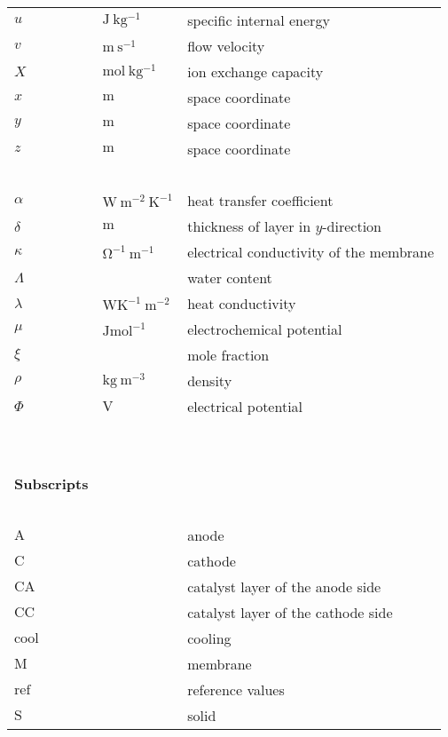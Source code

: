 \begin{longtable}	{p{3cm} p{3cm} p{8cm}}
	$u$ & $\mathrm{J ~kg^{-1}}$ & specific internal energy \\
	$v$ & $\mathrm{m ~s^{-1}}$ & flow velocity \\
	$X$ & $\mathrm{mol ~kg^{-1}}$ & ion exchange capacity \\
	$x$ & $\mathrm{m}$ & space coordinate \\
	$y$ & $\mathrm{m}$ & space coordinate \\
	$z$ & $\mathrm{m}$ & space coordinate \\	
	~ & ~ & ~ \\
	$\alpha$ & $\mathrm{W ~m^{-2} ~K^{-1}}$ & heat transfer coefficient \\
	$\delta$ & $\mathrm{m}$ & thickness of layer in $y$-direction \\
	$\kappa$ & $\mathrm{\Omega^{-1} ~m^{-1}}$ & electrical conductivity of the membrane \\
	$\mathit{\Lambda}$ & $~$ & water content \\
	$\lambda$ & $\mathrm{W K^{-1} ~m^{-2}}$ & heat conductivity \\
	$\mu$ & $\mathrm{J mol^{-1}}$ & electrochemical potential \\
	$\xi$ & $~$ & mole fraction \\
	$\rho$ & $\mathrm{kg ~m^{-3}}$ & density \\
	$\mathit{\Phi}$ & $\mathrm{V}$ & electrical potential \\
	~ & ~ & ~ \\
	~ & ~ & ~ \\
	\textbf{Subscripts} & ~ & ~ \\
	~ & ~ & ~ \\
	$\mathrm{A}$ & ~ & anode \\
	$\mathrm{C}$ & ~ & cathode \\
	$\mathrm{CA}$ & ~ & catalyst layer of the anode side \\
	$\mathrm{CC}$ & ~ & catalyst layer of the cathode side \\
	$\mathrm{cool}$ & ~ & cooling \\
	$\mathrm{M}$ & ~ & membrane \\
	$\mathrm{ref}$ & ~ & reference values \\
	$\mathrm{S}$ & ~ & solid \\
\end{longtable}
